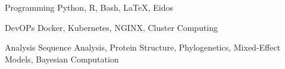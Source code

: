 

\begin{cvskills}

  \cvskill
    {Programming}
	{Python, R, Bash, LaTeX, Eidos}

  \cvskill
    {DevOPs}
	{Docker, Kubernetes, NGINX, Cluster Computing}

  \cvskill
    {Analysis}
	{Sequence Analysis, Protein Structure, Phylogenetics, Mixed-Effect Models, Bayesian Computation}
	
\end{cvskills}